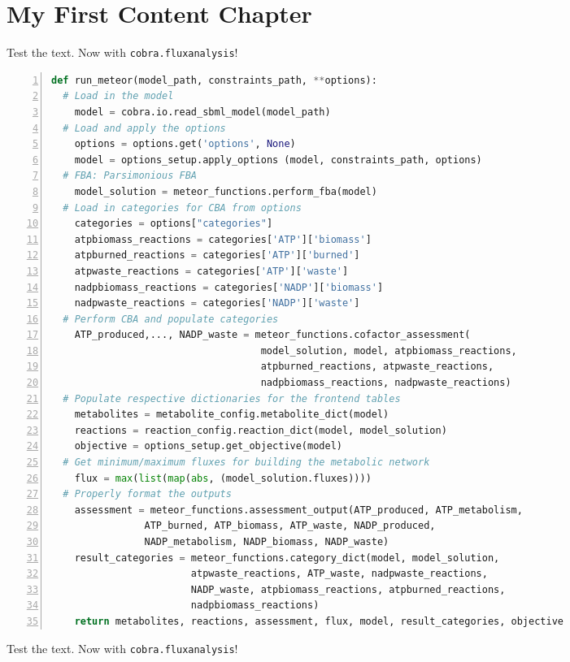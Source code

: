 \chapter{My First Content Chapter}
\label{chapterlabel1}

\blindtext


Test the text. Now with \texttt{cobra.flux\textunderscore analysis}!

\begin{spacing}{1.5}
\begin{lstlisting}[caption={Pseudocode snippet for \texttt{1-data\textunderscore preprocess.py}}, breaklines=true,basewidth=6pt,frame=single,language=Python, numbers=left, prebreak=**, postbreak=**, label={lst:code}]
def run_meteor(model_path, constraints_path, **options):
  # Load in the model
	model = cobra.io.read_sbml_model(model_path)
  # Load and apply the options
	options = options.get('options', None)
	model = options_setup.apply_options (model, constraints_path, options)
  # FBA: Parsimonious FBA
	model_solution = meteor_functions.perform_fba(model)
  # Load in categories for CBA from options
	categories = options["categories"]
	atpbiomass_reactions = categories['ATP']['biomass']
	atpburned_reactions = categories['ATP']['burned']
	atpwaste_reactions = categories['ATP']['waste'] 
	nadpbiomass_reactions = categories['NADP']['biomass']
	nadpwaste_reactions = categories['NADP']['waste'] 
  # Perform CBA and populate categories
	ATP_produced,..., NADP_waste = meteor_functions.cofactor_assessment(
                                    model_solution, model, atpbiomass_reactions,
                                    atpburned_reactions, atpwaste_reactions, 
                                    nadpbiomass_reactions, nadpwaste_reactions)
  # Populate respective dictionaries for the frontend tables
	metabolites = metabolite_config.metabolite_dict(model)
	reactions = reaction_config.reaction_dict(model, model_solution)
	objective = options_setup.get_objective(model)
  # Get minimum/maximum fluxes for building the metabolic network
	flux = max(list(map(abs, (model_solution.fluxes))))
  # Properly format the outputs
	assessment = meteor_functions.assessment_output(ATP_produced, ATP_metabolism,
                ATP_burned, ATP_biomass, ATP_waste, NADP_produced,
                NADP_metabolism, NADP_biomass, NADP_waste)
	result_categories = meteor_functions.category_dict(model, model_solution,
                        atpwaste_reactions, ATP_waste, nadpwaste_reactions,
                        NADP_waste, atpbiomass_reactions, atpburned_reactions,
                        nadpbiomass_reactions)
	return metabolites, reactions, assessment, flux, model, result_categories, objective
\end{lstlisting} 
\end{spacing}


Test the text. Now with \texttt{cobra.flux\textunderscore analysis}!